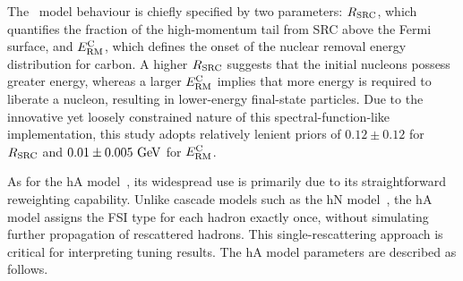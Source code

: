     The \sfcfg\ model behaviour is chiefly specified by two parameters: 
    $R_\textrm{SRC}$, which quantifies the fraction of the high-momentum tail from SRC above the Fermi surface, and 
    $E_\textrm{RM}^\textrm{C}$, which defines the onset of the nuclear removal energy distribution for carbon.  
    A higher $R_\textrm{SRC}$ suggests that the initial nucleons possess greater energy, whereas a larger $E_\textrm{RM}^\textrm{C}$ implies that more energy is required to liberate a nucleon, resulting in lower-energy final-state particles.  
    Due to the innovative yet loosely constrained nature of this spectral-function-like implementation, this study adopts relatively lenient priors of \(0.12\pm0.12\) for $R_\textrm{SRC}$ and \(0.01\pm0.005~\textrm{GeV}\) for $E_\textrm{RM}^\textrm{C}$.

    As for the hA model~\cite{Andreopoulos:2015wxa}, its widespread use is primarily due to its straightforward reweighting capability. 
    Unlike cascade models such as the hN model~\cite{Andreopoulos:2015wxa}, the hA model assigns the FSI type for each hadron exactly once, without simulating further propagation of rescattered hadrons. 
    This single-rescattering approach is critical for interpreting tuning results. The hA model parameters are described as follows.
